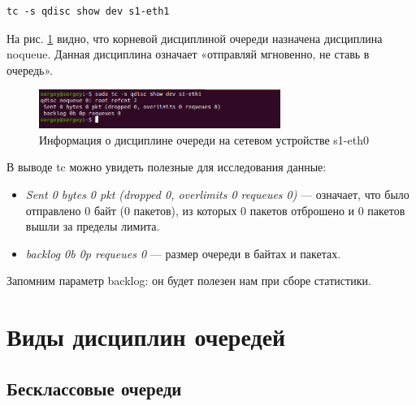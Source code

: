 \documentclass[
  13pt,
  fontsize=13pt,
  russian,
  a4paper,
,captions=tableheading
]{scrreprt}
\providecommand{\tightlist}{%
  \setlength{\itemsep}{0pt}\setlength{\parskip}{0pt}}
\begin{document}
\begin{verbatim}
tc -s qdisc show dev s1-eth1
\end{verbatim}

На рис. \ref{fig:0020} видно, что корневой дисциплиной очереди назначена
дисциплина noqueue. Данная дисциплина означает «отправляй мгновенно, не
ставь в очередь».

\begin{figure}
\hypertarget{fig:0020}{%
\centering
\includegraphics[width=0.7\textwidth,height=\textheight]{iproute_tc_qdisc_show_s1-eth1.png}
\caption{Информация о дисциплине очереди на сетевом устройстве
s1-eth0}\label{fig:0020}
}
\end{figure}

В выводе tc можно увидеть полезные для исследования данные:

\begin{itemize}
\tightlist
\item
  \emph{Sent 0 bytes 0 pkt (dropped 0, overlimits 0 requeues 0)} ---
  означает, что было отправлено 0 байт (0 пакетов), из которых 0 пакетов
  отброшено и 0 пакетов вышли за пределы лимита.
\item
  \emph{backlog 0b 0p requeues 0} --- размер очереди в байтах и пакетах.
\end{itemize}

Запомним параметр backlog: он будет полезен нам при сборе статистики.

\hypertarget{ux432ux438ux434ux44b-ux434ux438ux441ux446ux438ux43fux43bux438ux43d-ux43eux447ux435ux440ux435ux434ux435ux439}{%
\section{Виды дисциплин
очередей}\label{ux432ux438ux434ux44b-ux434ux438ux441ux446ux438ux43fux43bux438ux43d-ux43eux447ux435ux440ux435ux434ux435ux439}}

\hypertarget{ux431ux435ux441ux43aux43bux430ux441ux441ux43eux432ux44bux435-ux43eux447ux435ux440ux435ux434ux438}{%
\subsection{Бесклассовые
очереди}\label{ux431ux435ux441ux43aux43bux430ux441ux441ux43eux432ux44bux435-ux43eux447ux435ux440ux435ux434ux438}}
\end{document}

